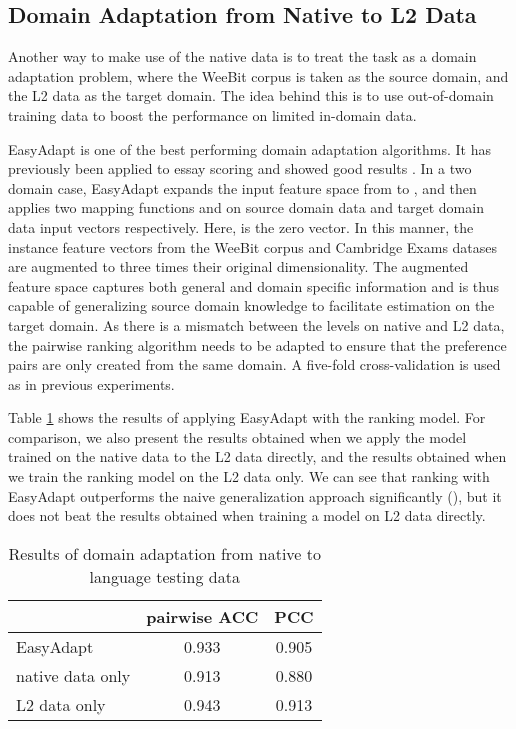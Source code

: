 \documentclass[11pt,letterpaper]{article}
\begin{document}
\subsection{Domain Adaptation from Native to L2 Data}

    Another way to make use of the native data is to treat the task as a domain adaptation problem, where the WeeBit corpus is taken as the source domain, and the L2 data as the target domain. The idea behind this is to use out-of-domain training data to boost the performance on limited in-domain data. 
    
    EasyAdapt \cite{daume2007frustratingly} is one of the best performing domain adaptation algorithms. It has previously been applied to essay scoring and showed good results \cite{phandiflexible}. In a two domain case, EasyAdapt expands the input feature space from  to , and then applies two mapping functions  and  on source domain data and target domain data input vectors respectively. Here,  is the zero vector. In this manner, the instance feature vectors from the WeeBit corpus and Cambridge Exams datases are augmented to three times their original dimensionality. The augmented feature space captures both general and domain specific information and is thus capable of generalizing source domain knowledge to facilitate estimation on the target domain. As there is a mismatch between the levels on native and L2 data, the pairwise ranking algorithm needs to be adapted to ensure that the preference pairs are only created from the same domain. A five-fold cross-validation is used as in previous experiments.
    
    Table \ref{ea} shows the results of applying EasyAdapt with the ranking model. For comparison, we also present the results obtained when we apply the model trained on the native data to the L2 data directly, and the results obtained when we train the ranking model on the L2 data only. We can see that ranking with EasyAdapt outperforms the naive generalization approach significantly (), but it does not beat the results obtained when training a model on L2 data directly.
    
    \begin{table}[t]
	\centering
	\small
	\begin{tabular}{l|c|c}
		\hline
		 & pairwise ACC & PCC\\
		\hline \hline
		EasyAdapt & 0.933 & 0.905\\ \hline
	    native data only &  0.913 & 0.880\\ \hline
		L2 data only & 0.943 & 0.913\\ \hline
	\end{tabular}
	\caption{Results of domain adaptation from native to language testing data}
	\label{ea}

    \end{table}
\end{document}
